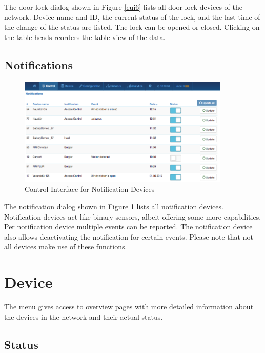The door lock dialog shown in Figure \ref{eui6} lists all door lock devices of the network. 
Device name and ID, the current status of the lock, and the last time of the change of 
the status are listed. The lock can be opened or closed.
Clicking on the table heads reorders the table view of the data.

\subsection{Notifications}

\begin{figure}
\begin{center}
\includegraphics[width=0.9\textwidth]{pngs/cap7/eui7.png}
\caption{Control Interface for Notification Devices}
\label{eui7}
\end{center}
\end{figure}

The notification dialog shown in Figure \ref{eui7} lists all notification devices. 
Notification devices act like binary sensors, albeit offering some more capabilities. 
Per notification device multiple events can be reported. The notification device also 
allows deactivating the notification for certain events. Please note that not all 
devices make use of these functions.

\section{Device}

The menu  gives access to overview pages with more detailed information about 
the devices in the network and their actual status.

\subsection{Status}

